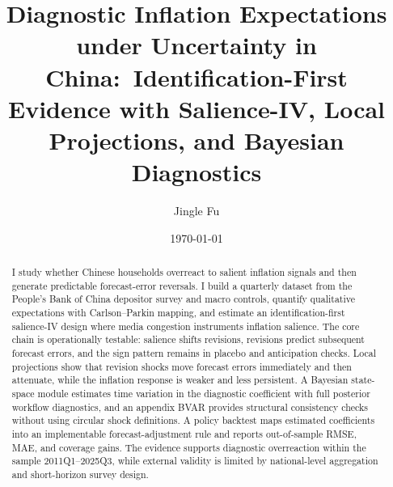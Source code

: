 ﻿\documentclass[12pt]{article}
\title{Diagnostic Inflation Expectations under Uncertainty in China:\
Identification-First Evidence with Salience-IV, Local Projections, and Bayesian Diagnostics}
\author{Jingle Fu}
\date{\today}
\begin{document}
\maketitle

\begin{abstract}
I study whether Chinese households overreact to salient inflation signals and then generate predictable forecast-error reversals. I build a quarterly dataset from the People's Bank of China depositor survey and macro controls, quantify qualitative expectations with Carlson--Parkin mapping, and estimate an identification-first salience-IV design where media congestion instruments inflation salience. The core chain is operationally testable: salience shifts revisions, revisions predict subsequent forecast errors, and the sign pattern remains in placebo and anticipation checks. Local projections show that revision shocks move forecast errors immediately and then attenuate, while the inflation response is weaker and less persistent. A Bayesian state-space module estimates time variation in the diagnostic coefficient with full posterior workflow diagnostics, and an appendix BVAR provides structural consistency checks without using circular shock definitions. A policy backtest maps estimated coefficients into an implementable forecast-adjustment rule and reports out-of-sample RMSE, MAE, and coverage gains. The evidence supports diagnostic overreaction within the sample 2011Q1--2025Q3, while external validity is limited by national-level aggregation and short-horizon survey design.
\end{abstract}











\appendix





\end{document}
